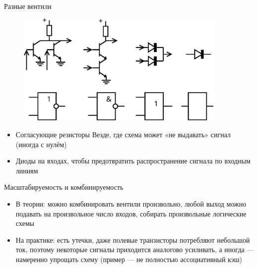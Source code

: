 \documentclass[xetex,aspectratio=43]{beamer}
\begin{document}
\begin{frame}{Разные вентили}
    \begin{figure}
    \includegraphics[width=0.9\textwidth]{img/07.transistor-gates.pdf}
    \end{figure}

    \begin{itemize}
    \tightlist
    \item
      Согласующие резисторы Везде, где схема может «не выдавать» сигнал
      (иногда с нулём)
    \item
      Диоды на входах, чтобы предотвратить распространение сигнала по
      входным линиям
    \end{itemize}
\end{frame}

\begin{frame}{Масштабируемость и комбинируемость}
	\begin{itemize}
		\item
		В теории: можно комбинировать вентили произвольно, любой выход можно подавать на произвольное число входов, собирать произвольные логические схемы
		\pause
		\item
		На практике: есть утечки, даже полевые транзисторы потребляют небольшой ток, поэтому некоторые сигналы приходится аналогово усиливать, а иногда --- намеренно упрощать схему (пример --- не полностью ассоциативный кэш)
	\end{itemize}
\end{frame}
\end{document}
